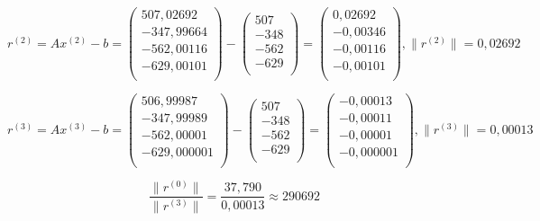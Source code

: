 \documentclass[a4paper,12pt]{article} %
\begin{document}
\begin{enumerate}
\begin{equation*}
    r^{(2)} = Ax^{(2)} - b =
    \begin{pmatrix}
        507,02692 \\
        -347,99664 \\
        -562,00116 \\
        -629,00101 \\
    \end{pmatrix}
    -
    \begin{pmatrix}
        507 \\
        -348 \\
        -562 \\
        -629 \\
    \end{pmatrix}
    =
    \begin{pmatrix}
        0,02692 \\
        -0,00346 \\
        -0,00116 \\
        -0,00101 \\
    \end{pmatrix}
    , \|r^{(2)}\| = 0,02692
\end{equation*}

\begin{equation*}
    r^{(3)} = Ax^{(3)} - b =
    \begin{pmatrix}
        506,99987 \\
        -347,99989 \\
        -562,00001 \\
        -629,000001 \\
    \end{pmatrix}
    -
    \begin{pmatrix}
        507 \\
        -348 \\
        -562 \\
        -629 \\
    \end{pmatrix}
    =
    \begin{pmatrix}
        -0,00013 \\
        -0,00011 \\
        -0,00001 \\
        -0,000001 \\
    \end{pmatrix}
    , \|r^{(3)}\| = 0,00013
\end{equation*}

$$\frac{\|r^{(0)}\|}{\|r^{(3)}\|} = \frac{37,790}{0,00013} \approx 290692$$


\end{enumerate}
\end{document}
